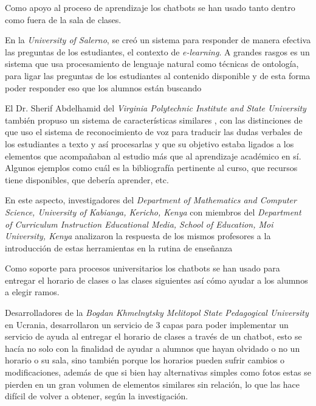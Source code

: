     \par Como apoyo al proceso de aprendizaje los chatbots se han usado tanto dentro como fuera de la sala de clases.
    \par En la \textit{University of Salerno}, se creó un sistema para responder de manera efectiva las preguntas de los estudiantes, el contexto de \textit{e-learning}. A grandes rasgos es un sistema que usa procesamiento de lenguaje natural como técnicas de ontología, para ligar las preguntas de los estudiantes al contenido disponible y de esta forma poder responder eso que los alumnos están buscando \cite{Clarizia2018}
    \par El Dr. Sherif Abdelhamid del \textit{Virginia Polytechnic Institute and State University} también propuso un sistema de características similares \cite{Abdelhamid2020}, con las distinciones de que uso el sistema de reconocimiento de voz para traducir las dudas verbales de los estudiantes a texto y así procesarlas y que su objetivo estaba ligados a los elementos que acompañaban al estudio más que al aprendizaje académico en sí. Algunos ejemplos como cuál es la bibliografía pertinente al curso, que recursos tiene disponibles, que debería aprender, etc.
    \par En este aspecto, investigadores del \textit{Department of Mathematics and Computer Science, University of Kabianga, Kericho, Kenya} con miembros del \textit{Department of Curriculum Instruction Educational Media, School of Education, Moi University, Kenya} analizaron la respuesta de los mismos profesores a la introducción de estas herramientas en la rutina de enseñanza \cite{K2018}
    
    \par Como soporte para procesos universitarios los chatbots se han usado para entregar el horario de clases o las clases siguientes así cómo ayudar a los alumnos a elegir ramos.
    
    \par Desarrolladores de la \textit{Bogdan Khmelnytsky Melitopol State Pedagogical University} en Ucrania, desarrollaron un servicio de 3 capas para poder implementar un servicio de ayuda al entregar el horario de clases a través de un chatbot, esto se hacía no solo con la finalidad de ayudar a alumnos que hayan olvidado o no un horario o su sala, sino también porque los horarios pueden sufrir cambios o modificaciones, además de que si bien hay alternativas simples como fotos estas se pierden en un gran volumen de elementos similares sin relación, lo que las hace difícil de volver a obtener, según la investigación. \cite{Priadko2019}
    
